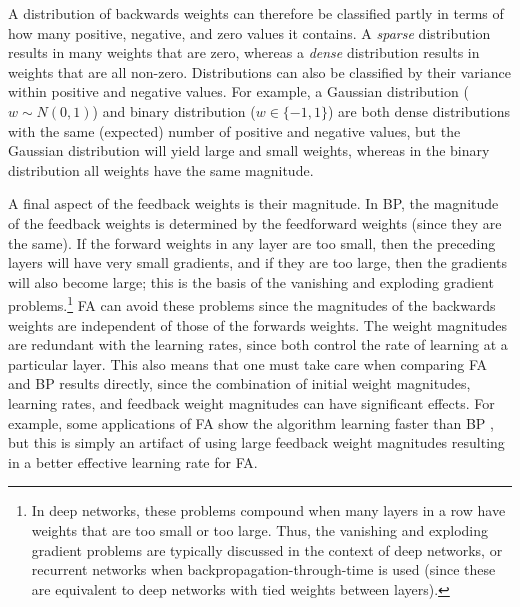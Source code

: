 A distribution of backwards weights can therefore be classified partly in terms of
how many positive, negative, and zero values it contains.
A \emph{sparse} distribution results in many weights that are zero,
whereas a \emph{dense} distribution results in weights that are all non-zero.
Distributions can also be classified by their variance
within positive and negative values.
For example, a Gaussian distribution ($w \sim N(0, 1)$) and binary distribution ($w \in \{-1, 1\}$)
are both dense distributions with the same (expected) number
of positive and negative values,
but the Gaussian distribution will yield large and small weights,
whereas in the binary distribution all weights have the same magnitude.

A final aspect of the feedback weights is their magnitude.
In BP, the magnitude of the feedback weights is determined
by the feedforward weights (since they are the same).
If the forward weights in any layer are too small,
then the preceding layers will have very small gradients,
and if they are too large, then the gradients will also become large;
this is the basis of the vanishing and exploding gradient problems.\footnote{
  In deep networks, these problems compound when many layers in a row
  have weights that are too small or too large.
  Thus, the vanishing and exploding gradient problems are typically discussed
  in the context of deep networks,
  or recurrent networks when backpropagation-through-time is used
  (since these are equivalent to deep networks with tied weights between layers).}
FA can avoid these problems since the magnitudes of the backwards weights
are independent of those of the forwards weights.
The weight magnitudes are redundant with the learning rates,
since both control the rate of learning at a particular layer.
This also means that one must take care when comparing FA and BP results directly,
since the combination of initial weight magnitudes, learning rates,
and feedback weight magnitudes can have significant effects.
For example, some applications of FA show the algorithm
learning faster than BP \parencite[\eg/][Figure 3d]{Lillicrap2016},
but this is simply an artifact of using large feedback weight magnitudes
resulting in a better effective learning rate for FA.


